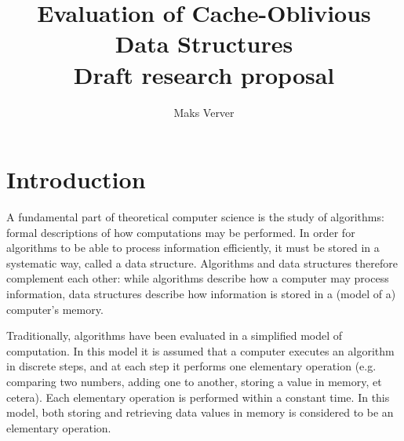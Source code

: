 \documentclass{acm_proc_article-sp}
\begin{document}
\title{Evaluation of Cache-Oblivious Data Structures\\Draft research proposal}

\author{Maks Verver\\ }


\maketitle


\section{Introduction}
A fundamental part of theoretical computer science is the study of algorithms: formal descriptions of how computations may be performed. In order for algorithms to be able to process information efficiently, it must be stored in a systematic way, called a data structure. Algorithms and data structures therefore complement each other: while algorithms describe how a computer may process information, data structures describe how information is stored in a (model of a) computer's memory.

Traditionally, algorithms have been evaluated in a simplified model of computation. In this model it is assumed that a computer executes an algorithm in discrete steps, and at each step it performs one elementary operation (e.g. comparing two numbers, adding one to another, storing a value in memory, et cetera). Each elementary operation is performed within a constant time. In this model, both storing and retrieving data values in memory is considered to be an elementary operation.
\end{document}
